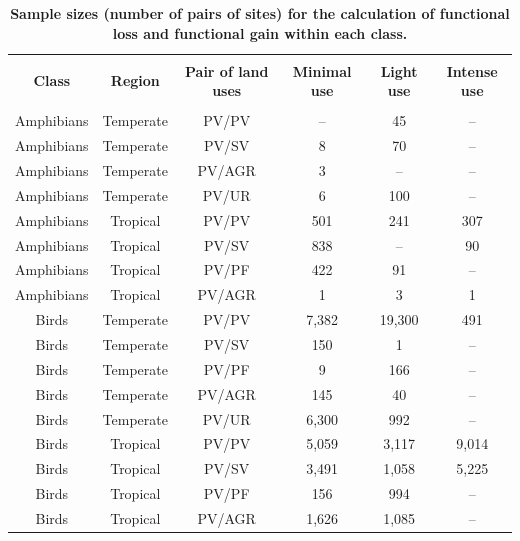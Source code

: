 \clearpage
\newpage

\begin{table}[!htbp]
\renewcommand{\baselinestretch}{1}
\renewcommand{\arraystretch}{1.2}
\begin{center}\fontsize{9}{11}\selectfont
  \caption[Sample sizes (number of pairs of sites) for the calculation of functional loss and functional gain within each class]{\textbf{Sample sizes (number of pairs of sites) for the calculation of functional loss and functional gain within each class.}}
  \label{} 
\begin{tabular}{@{\extracolsep{5pt}} cccccc} 
\\[-1.8ex]\hline 
\hline \\[-1.8ex] 
\textbf{Class} & \textbf{Region} & \textbf{Pair of land uses} & \textbf{Minimal use} & \textbf{Light use} & \textbf{Intense use}\\ 
\hline \\[-1.8ex] 
Amphibians & Temperate & PV/PV & -- & 45 & -- \\ 
Amphibians & Temperate & PV/SV & 8 & 70 & -- \\ 
Amphibians & Temperate & PV/AGR & 3 & -- & -- \\ 
Amphibians & Temperate & PV/UR & 6 & 100 & -- \\ 
Amphibians & Tropical & PV/PV & 501 & 241 & 307 \\ 
Amphibians & Tropical & PV/SV & 838 & -- & 90 \\ 
Amphibians & Tropical & PV/PF & 422 & 91 & -- \\ 
Amphibians & Tropical & PV/AGR & 1 & 3 & 1 \\ 
Birds & Temperate & PV/PV & 7,382 & 19,300 & 491 \\ 
Birds & Temperate & PV/SV & 150 & 1 & -- \\ 
Birds & Temperate & PV/PF & 9 & 166 & -- \\ 
Birds & Temperate & PV/AGR & 145 & 40 & -- \\ 
Birds & Temperate & PV/UR & 6,300 & 992 & -- \\ 
Birds & Tropical & PV/PV & 5,059 & 3,117 & 9,014 \\ 
Birds & Tropical & PV/SV & 3,491 & 1,058 & 5,225 \\ 
Birds & Tropical & PV/PF & 156 & 994 & -- \\ 
Birds & Tropical & PV/AGR & 1,626 & 1,085 & -- \\ 

\end{tabular}
\end{center}
\end{table}

